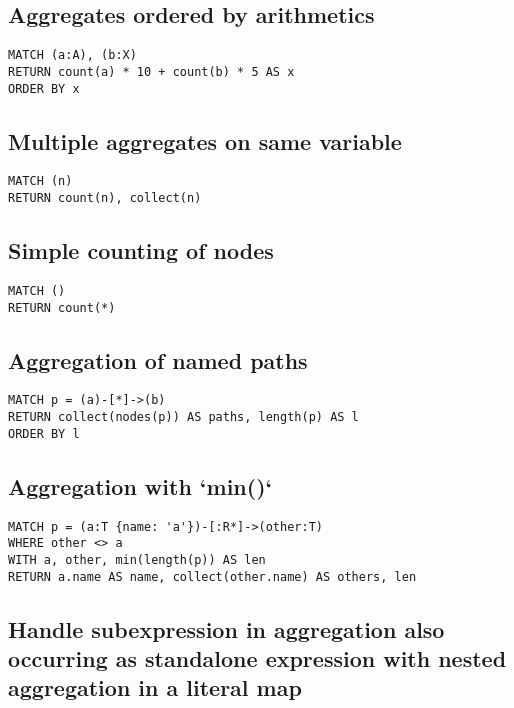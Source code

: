\subsection{Aggregates ordered by arithmetics}

\begin{lstlisting}
MATCH (a:A), (b:X)
RETURN count(a) * 10 + count(b) * 5 AS x
ORDER BY x
\end{lstlisting}

\subsection{Multiple aggregates on same variable}

\begin{lstlisting}
MATCH (n)
RETURN count(n), collect(n)
\end{lstlisting}

\subsection{Simple counting of nodes}

\begin{lstlisting}
MATCH ()
RETURN count(*)
\end{lstlisting}

\subsection{Aggregation of named paths}

\begin{lstlisting}
MATCH p = (a)-[*]->(b)
RETURN collect(nodes(p)) AS paths, length(p) AS l
ORDER BY l
\end{lstlisting}

\subsection{Aggregation with `min()`}

\begin{lstlisting}
MATCH p = (a:T {name: 'a'})-[:R*]->(other:T)
WHERE other <> a
WITH a, other, min(length(p)) AS len
RETURN a.name AS name, collect(other.name) AS others, len
\end{lstlisting}

\subsection{Handle subexpression in aggregation also occurring as standalone expression with nested aggregation in a literal map}

